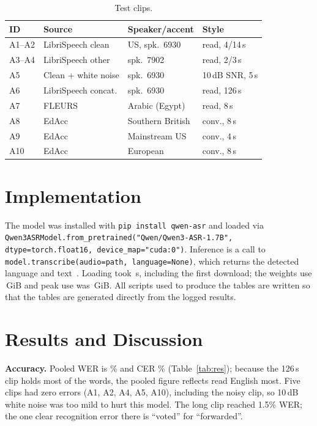 \documentclass[conference]{IEEEtran}
\begin{document}
\begin{table}[t]\centering\caption{Test clips.}\label{tab:clips}\scriptsize
\begin{tabular}{@{}llll@{}}\toprule
ID & Source & Speaker/accent & Style\\\midrule
A1--A2 & LibriSpeech clean & US, spk.\ 6930 & read, 4/14\,s\\
A3--A4 & LibriSpeech other & spk.\ 7902 & read, 2/3\,s\\
A5 & Clean + white noise & spk.\ 6930 & 10\,dB SNR, 5\,s\\
A6 & LibriSpeech concat. & spk.\ 6930 & read, 126\,s\\
A7 & FLEURS & Arabic (Egypt) & read, 8\,s\\
A8 & EdAcc & Southern British & conv., 8\,s\\
A9 & EdAcc & Mainstream US & conv., 4\,s\\
A10 & EdAcc & European & conv., 8\,s\\\bottomrule
\end{tabular}\end{table}

\section{Implementation}
The model was installed with \texttt{pip install qwen-asr} and loaded via \texttt{Qwen3ASRModel.from\_pretrained("Qwen/Qwen3-ASR-1.7B", dtype=torch.float16, device\_map="cuda:0")}. Inference is a call to \texttt{model.transcribe(audio=path, language=None)}, which returns the detected language and text~\cite{qwen3asrgh}. Loading took \loadtime\,s, including the first download; the weights use \vramload\,GiB and peak use was \vrampeak\,GiB. All scripts used to produce the tables are written so that the tables are generated directly from the logged results.

\section{Results and Discussion}\label{sec:res}
\begin{table}[t]\centering\caption{Per-clip results. Lat = latency, WER/CER in \%.}\label{tab:res}\scriptsize
\resizebox{\columnwidth}{!}{\resultstable}\end{table}

\textbf{Accuracy.} Pooled WER is \poolwer\% and CER \poolcer\% (Table~\ref{tab:res}); because the 126\,s clip holds most of the words, the pooled figure reflects read English most. Five clips had zero errors (A1, A2, A4, A5, A10), including the noisy clip, so 10\,dB white noise was too mild to hurt this model. The long clip reached 1.5\% WER; the one clear recognition error there is ``voted'' for ``forwarded''.
\end{document}
